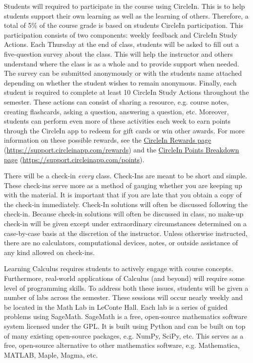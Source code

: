 \documentclass[11pt,letterpaper]{article}
\begin{document}
Students will required to participate in the course using CircleIn. This is to help students support their own learning as well as the learning of others. Therefore, a total of 5\% of the course grade is based on students CircleIn participation. This participation consists of two components: weekly feedback and CircleIn Study Actions. Each Thursday at the end of class, students will be asked to fill out a five-question survey about the class. This will help the instructor and others understand where the class is as a whole and to provide support when needed. The survey can be submitted anonymously or with the students name attached depending on whether the student wishes to remain anonymous. Finally, each student is required to complete at least 10 CircleIn Study Actions throughout the semester. These actions can consist of sharing a resource, e.g. course notes, creating flashcards, asking a question, answering a question, etc. Moreover, students can perform even more of these activities each week to earn points through the CircleIn app to redeem for gift cards or win other awards. For more information on these possible rewards, see the \href{https://support.circleinapp.com/rewards}{CircleIn Rewards page} (\url{https://support.circleinapp.com/rewards}) and the \href{https://support.circleinapp.com/points}{CircleIn Points Breakdown page} (\url{https://support.circleinapp.com/points}). 
\sectionbreak




There will be a check-in \textit{every} class. Check-Ins are meant to be short and simple. These check-ins serve more as a method of gauging whether you are keeping up with the material. It is important that if you are late that you obtain a copy of the check-in immediately. Check-In solutions will often be discussed following the check-in. Because check-in solutions will often be discussed in class, no make-up check-in will be given except under extraordinary circumstances determined on a case-by-case basis at the discretion of the instructor. Unless otherwise instructed, there are no calculators, computational devices, notes, or outside assistance of any kind allowed on check-ins. 
\par\vspace{0.6cm}



Learning Calculus requires students to actively engage with course concepts. Furthermore, real-world applications of Calculus (and beyond) will require some level of programming skills. To address both these issues, students will be given a number of labs across the semester. These sessions will occur nearly weekly and be located in the Math Lab in LeConte Hall. Each lab is a series of guided problems using SageMath. SageMath is a free, open-source mathematics software system licensed under the GPL. It is built using Python and can be built on top of many existing open-source packages, e.g. NumPy, SciPy, etc. This serves as a free, open-source alternative to other mathematics software, e.g. Mathematica, MATLAB, Maple, Magma, etc. \pspace
\end{document}
